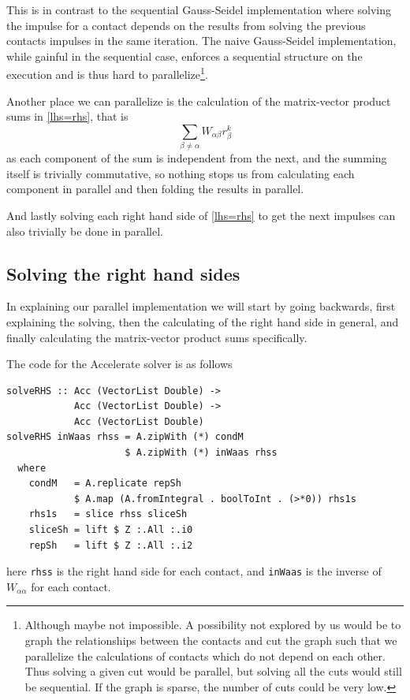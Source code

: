 \documentclass[runningheads,a4paper]{llncs}
\begin{document}
This is in contrast to the sequential Gauss-Seidel implementation
where solving the impulse for a contact depends
on the results from solving the previous contacts impulses
in the same iteration.
The naive Gauss-Seidel implementation,
while gainful in the sequential case,
enforces a sequential structure on the execution
and is thus hard to parallelize\footnote{
  Although maybe not impossible. A possibility not explored by us
  would be to graph the relationships between the contacts
  and cut the graph such that we parallelize the calculations
  of contacts which do not depend on each other.
  Thus solving a given cut would be parallel,
  but solving all the cuts would still be sequential.
  If the graph is sparse, the number of cuts could be very low.}.

Another place we can parallelize is the calculation
of the matrix-vector product sums in \eqref{lhs=rhs},
that is \[\sum\limits_{\beta \neq \alpha} W_{\alpha\beta} r_\beta^k\]
as each component of the sum is independent from the next,
and the summing itself is trivially commutative,
so nothing stops us from calculating each component in parallel
and then folding the results in parallel.

And lastly solving each right hand side of \eqref{lhs=rhs}
to get the next impulses can also trivially be done in parallel.

\subsection{Solving the right hand sides}
In explaining our parallel implementation we will start
by going backwards, first explaining the solving,
then the calculating of the right hand side in general,
and finally calculating the matrix-vector product sums specifically.

The code for the Accelerate solver is as follows
\begin{verbatim}
solveRHS :: Acc (VectorList Double) ->
            Acc (VectorList Double) ->
            Acc (VectorList Double)
solveRHS inWaas rhss = A.zipWith (*) condM
                     $ A.zipWith (*) inWaas rhss
  where
    condM   = A.replicate repSh
            $ A.map (A.fromIntegral . boolToInt . (>*0)) rhs1s
    rhs1s   = slice rhss sliceSh
    sliceSh = lift $ Z :.All :.i0
    repSh   = lift $ Z :.All :.i2
\end{verbatim}
here \texttt{rhss} is the right hand side for each contact,
and \texttt{inWaas} is the inverse of $W_{\alpha\alpha}$ for each contact.
\end{document}
